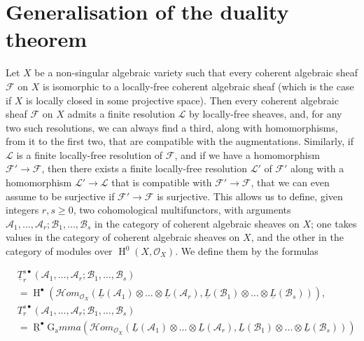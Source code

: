 \section{Generalisation of the duality theorem}\label{fga1-8}


Let $X$ be a non-singular algebraic variety such that every coherent algebraic sheaf $\mathcal{F}$ on $X$ is isomorphic to a locally-free coherent algebraic sheaf (which is the case if $X$ is locally closed in some projective space).
Then every coherent algebraic sheaf $\mathcal{F}$ on $X$ admits a finite resolution $\mathcal{L}$ by locally-free sheaves, and, for any two such resolutions, we can always find a third, along with homomorphisms, from it to the first two, that are compatible with the augmentations.
Similarly, if $\mathcal{L}$ is a finite locally-free resolution of $\mathcal{F}$, and if we have a homomorphism $\mathcal{F}'\to\mathcal{F}$, then there exists a finite locally-free resolution $\mathcal{L}'$ of $\mathcal{F}'$ along with a homomorphism $\mathcal{L}'\to\mathcal{L}$ that is compatible with $\mathcal{F}'\to\mathcal{F}$, that we can even assume to be surjective if $\mathcal{F}'\to\mathcal{F}$ is surjective.
This allows us to define, given integers $r,s\geqslant0$, two cohomological multifunctors, with arguments $\mathcal{A}_1,\ldots,\mathcal{A}_r;\mathcal{B}_1,\ldots,\mathcal{B}_s$ in the category of coherent algebraic sheaves on $X$;
one takes values in the category of coherent algebraic sheaves on $X$, and the other in the category of modules over $\operatorname{H}^0(X,\mathcal{O}_X)$.
We define them by the formulas

\begin{equation}\tag{8.1}\label{fga1-equation-8.1}
  \begin{aligned}
     & \underline{T}_r^{s\bullet}(\mathcal{A}_1,\ldots,\mathcal{A}_r;\mathcal{B}_1,\ldots,\mathcal{B}_s)
    \\&= \operatorname{H}^\bullet(\mathcal{H}om_{\mathcal{O}_X}(\underline{L}(\mathcal{A}_1)\otimes\ldots\otimes\underline{L}(\mathcal{A}_r), \underline{L}(\mathcal{B}_1)\otimes\ldots\otimes\underline{L}(\mathcal{B}_s))),
    \\&T_r^{s\bullet}(\mathcal{A}_1,\ldots,\mathcal{A}_r;\mathcal{B}_1,\ldots,\mathcal{B}_s)
    \\&= \underline{\operatorname{R}}^\bullet\operatorname{G_a}mma(\mathcal{H}om_{\mathcal{O}_X}(\underline{L}(\mathcal{A}_1)\otimes\ldots\otimes\underline{L}(\mathcal{A}_r), \underline{L}(\mathcal{B}_1)\otimes\ldots\otimes\underline{L}(\mathcal{B}_s)))
  \end{aligned}
\end{equation}

